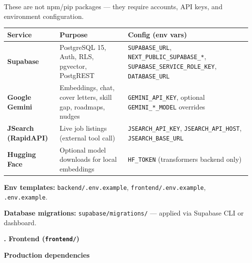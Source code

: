 \documentclass[11pt,a4paper]{article}
\newcommand{\pkg}[1]{\texttt{#1}}
\newcommand{\envvar}[1]{\texttt{#1}}
\newcommand{\sectiontitle}[1]{%
  \vspace{0.9em}%
  \noindent
  \colorbox{sectiontitlebg}{%
    \parbox{\dimexpr\linewidth-2\fboxsep}{%
      \vspace{6pt}%
      {\fontsize{18}{22}\bfseries\selectfont #1}%
      \vspace{6pt}%
    }%
  }%
  \par\vspace{0.55em}%
}
\newcommand{\subsectiontitle}[1]{%
  \vspace{0.65em}%
  {\large\bfseries\color{subsec} #1\par}%
  \vspace{0.35em}%
}
\begin{document}
\noindent
These are not npm/pip packages --- they require accounts, API keys, and environment configuration.

\vspace{0.45em}
\begin{center}
\small
\renewcommand{\arraystretch}{1.22}
\begin{tabularx}{\linewidth}{@{}L{2.4cm} L{4.6cm} X@{}}
\toprule
\textbf{Service} & \textbf{Purpose} & \textbf{Config (env vars)} \\
\midrule
\textbf{Supabase} &
PostgreSQL 15, Auth, RLS, pgvector, PostgREST &
\envvar{SUPABASE\_URL}, \envvar{NEXT\_PUBLIC\_SUPABASE\_*}, \envvar{SUPABASE\_SERVICE\_ROLE\_KEY}, \envvar{DATABASE\_URL} \\
\textbf{Google Gemini} &
Embeddings, chat, cover letters, skill gap, roadmaps, nudges &
\envvar{GEMINI\_API\_KEY}, optional \envvar{GEMINI\_*\_MODEL} overrides \\
\textbf{JSearch (RapidAPI)} &
Live job listings (external tool call) &
\envvar{JSEARCH\_API\_KEY}, \envvar{JSEARCH\_API\_HOST}, \envvar{JSEARCH\_BASE\_URL} \\
\textbf{Hugging Face} &
Optional model downloads for local embeddings &
\envvar{HF\_TOKEN} (transformers backend only) \\
\bottomrule
\end{tabularx}
\end{center}

\vspace{0.35em}
\noindent\textbf{Env templates:}
\pkg{backend/.env.example},
\pkg{frontend/.env.example},
\pkg{.env.example}.

\vspace{0.25em}
\noindent\textbf{Database migrations:}
\pkg{supabase/migrations/} --- applied via Supabase CLI or dashboard.

\sectiontitle{3. Frontend (\texttt{frontend/})}

\subsectiontitle{Production dependencies}
\end{document}
